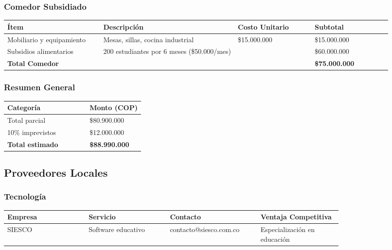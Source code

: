 \documentclass[letterpaper, 11pt]{report}
\begin{document}
\subsubsection{Comedor Subsidiado}

\begin{longtable}{|p{0.25\linewidth}|p{0.35\linewidth}|p{0.20\linewidth}|p{0.20\linewidth}|}
      \hline
      \textbf{Ítem}             & \textbf{Descripción}                       & \textbf{Costo Unitario} & \textbf{Subtotal}     \\
      \hline
      Mobiliario y equipamiento & Mesas, sillas, cocina industrial           & \$15.000.000            & \$15.000.000          \\
      \hline
      Subsidios alimentarios    & 200 estudiantes por 6 meses (\$50.000/mes) &                         & \$60.000.000          \\
      \hline
      \textbf{Total Comedor}    &                                            &                         & \textbf{\$75.000.000} \\
      \hline
\end{longtable}

\subsubsection{Resumen General}
\begin{longtable}{|p{0.6\linewidth}|p{0.4\linewidth}|}
      \hline
      \textbf{Categoría}      & \textbf{Monto (COP)}  \\
      \hline
      Total parcial           & \$80.900.000          \\
      \hline
      10\% imprevistos        & \$12.000.000          \\
      \hline
      \textbf{Total estimado} & \textbf{\$88.990.000} \\
      \hline
\end{longtable}

\subsection{Proveedores Locales}

\subsubsection{Tecnología}

\begin{longtable}{|p{0.2\linewidth}|p{0.2\linewidth}|p{0.2\linewidth}|p{0.2\linewidth}|}
      \hline
      \textbf{Empresa} & \textbf{Servicio}  & \textbf{Contacto}      & \textbf{Ventaja Competitiva} \\
      \hline
      SIESCO           & Software educativo & contacto@siesco.com.co &
      Especialización en educación                                                                  \\\hline

\end{longtable}
\end{document}
